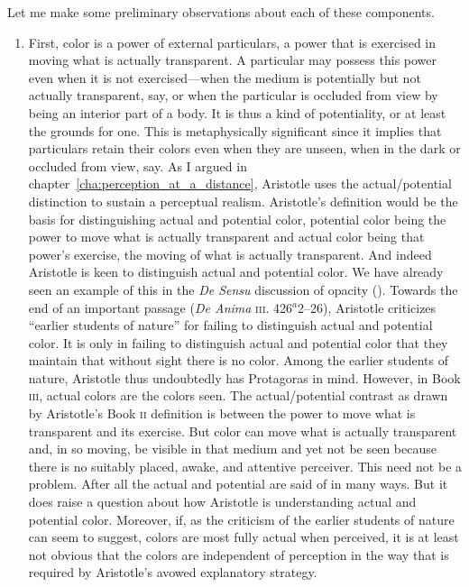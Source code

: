 Let me make some preliminary observations about each of these components.
\begin{enumerate}[(1)]
	\item First, color is a power of external particulars, a power that is exercised in moving what is actually transparent. A particular may possess this power even when it is not exercised---when the medium is potentially but not actually transparent, say, or when the particular is occluded from view by being an interior part of a body. It is thus a kind of potentiality, or at least the grounds for one. This is metaphysically significant since it implies that particulars retain their colors even when they are unseen, when in the dark or occluded from view, say. As I argued in chapter~\ref{cha:perception_at_a_distance}, Aristotle uses the actual/potential distinction to sustain a perceptual realism. Aristotle's definition would be the basis for distinguishing actual and potential color, potential color being the power to move what is actually transparent and actual color being that power's exercise, the moving of what is actually transparent. And indeed Aristotle is keen to distinguish actual and potential color. We have already seen an example of this in the \emph{De Sensu} discussion of opacity (\pageref{actual_potential}). Towards the end of an important passage (\emph{De Anima} \textsc{iii}. 426\( ^{a} \)2--26), Aristotle criticizes ``earlier students of nature'' for failing to distinguish actual and potential color. It is only in failing to distinguish actual and potential color that they maintain that without sight there is no color. Among the earlier students of nature, Aristotle thus undoubtedly has Protagoras in mind. However, in Book \textsc{iii}, actual colors are the colors seen. The actual/potential contrast as drawn by Aristotle's Book \textsc{ii} definition is between the power to move what is transparent and its exercise. But color can move what is actually transparent and, in so moving, be visible in that medium and yet not be seen because there is no suitably placed, awake, and attentive perceiver. This need not be a problem. After all the actual and potential are said of in many ways. But it does raise a question about how Aristotle is understanding actual and potential color. Moreover, if, as the criticism of the earlier students of nature can seem to suggest, colors are most fully actual when perceived, it is at least not obvious that the colors are independent of perception in the way that is required by Aristotle's avowed explanatory strategy.

\end{enumerate}
